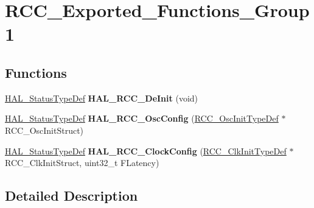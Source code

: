 \hypertarget{group___r_c_c___exported___functions___group1}{}\section{R\+C\+C\+\_\+\+Exported\+\_\+\+Functions\+\_\+\+Group1}
\label{group___r_c_c___exported___functions___group1}
\subsection*{Functions}
\begin{DoxyCompactItemize}
\item 
\mbox{\label{group___r_c_c___exported___functions___group1_ga064f7d9878ecdc1d4852cba2b9e6a52e}} 
\hyperlink{stm32f4xx__hal__def_8h_a63c0679d1cb8b8c684fbb0632743478f}{H\+A\+L\+\_\+\+Status\+Type\+Def} {\bfseries H\+A\+L\+\_\+\+R\+C\+C\+\_\+\+De\+Init} (void)
\item 
\mbox{\label{group___r_c_c___exported___functions___group1_ga9c504088722e03830df6caad932ad06b}} 
\hyperlink{stm32f4xx__hal__def_8h_a63c0679d1cb8b8c684fbb0632743478f}{H\+A\+L\+\_\+\+Status\+Type\+Def} {\bfseries H\+A\+L\+\_\+\+R\+C\+C\+\_\+\+Osc\+Config} (\hyperlink{struct_r_c_c___osc_init_type_def}{R\+C\+C\+\_\+\+Osc\+Init\+Type\+Def} $\ast$R\+C\+C\+\_\+\+Osc\+Init\+Struct)
\item 
\mbox{\label{group___r_c_c___exported___functions___group1_gad0a4b5c7459219fafc15f3f867563ef3}} 
\hyperlink{stm32f4xx__hal__def_8h_a63c0679d1cb8b8c684fbb0632743478f}{H\+A\+L\+\_\+\+Status\+Type\+Def} {\bfseries H\+A\+L\+\_\+\+R\+C\+C\+\_\+\+Clock\+Config} (\hyperlink{struct_r_c_c___clk_init_type_def}{R\+C\+C\+\_\+\+Clk\+Init\+Type\+Def} $\ast$R\+C\+C\+\_\+\+Clk\+Init\+Struct, uint32\+\_\+t F\+Latency)
\end{DoxyCompactItemize}


\subsection{Detailed Description}
